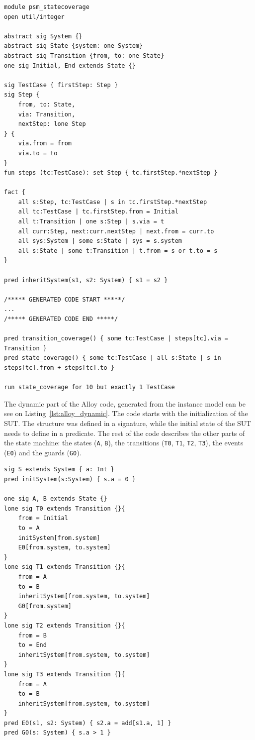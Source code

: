 \begin{lstlisting}[label={lst:alloy_static}, caption=Test suite generator Alloy code,breaklines=true]
module psm_statecoverage
open util/integer

abstract sig System {}
abstract sig State {system: one System}
abstract sig Transition {from, to: one State}
one sig Initial, End extends State {}

sig TestCase { firstStep: Step }
sig Step {
	from, to: State,
	via: Transition,
	nextStep: lone Step
} {
	via.from = from
	via.to = to
}
fun steps (tc:TestCase): set Step { tc.firstStep.*nextStep }

fact {
	all s:Step, tc:TestCase | s in tc.firstStep.*nextStep
	all tc:TestCase | tc.firstStep.from = Initial
	all t:Transition | one s:Step | s.via = t
	all curr:Step, next:curr.nextStep | next.from = curr.to
	all sys:System | some s:State | sys = s.system
	all s:State | some t:Transition | t.from = s or t.to = s
}

pred inheritSystem(s1, s2: System) { s1 = s2 }

/***** GENERATED CODE START *****/
...
/***** GENERATED CODE END *****/

pred transition_coverage() { some tc:TestCase | steps[tc].via = Transition }
pred state_coverage() { some tc:TestCase | all s:State | s in steps[tc].from + steps[tc].to }

run state_coverage for 10 but exactly 1 TestCase
\end{lstlisting}

The dynamic part of the Alloy code, generated from the instance model can be see on Listing~\ref{lst:alloy_dynamic}. The code starts with the initialization of the SUT. The structure was defined in a signature, while the initial state of the SUT needs to define in a predicate. The rest of the code describes the other parts of the state machine: the states (\texttt{A}, \texttt{B}), the transitions (\texttt{T0}, \texttt{T1}, \texttt{T2}, \texttt{T3}), the events (\texttt{E0}) and the guards (\texttt{G0}).

\begin{lstlisting}[label={lst:alloy_dynamic}, caption=Dynamically generated Alloy codes,breaklines=true]
sig S extends System { a: Int }
pred initSystem(s:System) { s.a = 0 }

one sig A, B extends State {}
lone sig T0 extends Transition {}{
	from = Initial
	to = A
	initSystem[from.system]
	E0[from.system, to.system]
}
lone sig T1 extends Transition {}{
	from = A
	to = B
	inheritSystem[from.system, to.system]
	G0[from.system]
}
lone sig T2 extends Transition {}{
	from = B
	to = End
	inheritSystem[from.system, to.system]
}
lone sig T3 extends Transition {}{
	from = A
	to = B
	inheritSystem[from.system, to.system]
}
pred E0(s1, s2: System) { s2.a = add[s1.a, 1] }
pred G0(s: System) { s.a > 1 }
\end{lstlisting}

